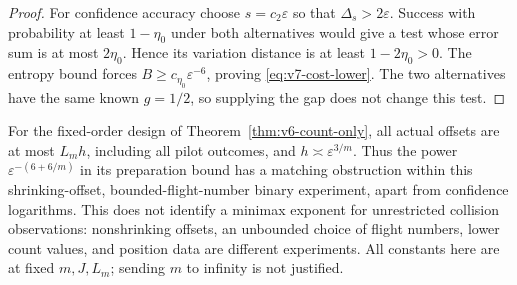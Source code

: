 \begin{proof}
For confidence accuracy choose $s=c_2\varepsilon$ so that
$\Delta_s>2\varepsilon$. Success with probability at least
$1-\eta_0$ under both alternatives would give a test whose error sum
is at most $2\eta_0$. Hence its variation distance is at least
$1-2\eta_0>0$. The entropy bound forces
$B\ge c_{\eta_0}\varepsilon^{-6}$, proving
\eqref{eq:v7-cost-lower}. The two alternatives have the same known
$g=1/2$, so supplying the gap does not change this test.
\end{proof}

For the fixed-order design of Theorem~\ref{thm:v6-count-only}, all
actual offsets are at most $L_mh$, including all pilot outcomes, and
$h\asymp\varepsilon^{3/m}$. Thus the power
$\varepsilon^{-(6+6/m)}$ in its preparation bound has a matching
obstruction within this shrinking-offset, bounded-flight-number binary
experiment, apart from confidence logarithms. This does not identify
a minimax exponent for unrestricted collision observations: nonshrinking
offsets, an unbounded choice of flight numbers, lower count values,
and position data are different experiments. All constants here are
at fixed $m,J,L_m$; sending $m$ to infinity is not justified.

